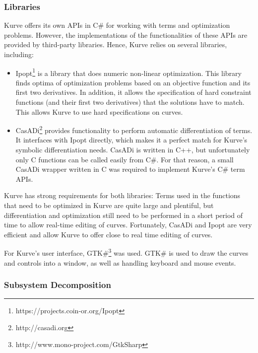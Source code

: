 \documentclass[a4paper]{article}
\begin{document}
			\subsubsection{Libraries}
				
				Kurve offers its own APIs in C\# for working with terms and optimization problems. However, the implementations of the functionalities of these APIs are provided by third-party libraries. Hence, Kurve relies on several libraries, including:
				
				\begin{itemize}
				  	\item Ipopt\footnote{https://projects.coin-or.org/Ipopt} is a library that does numeric non-linear optimization. This library finds optima of optimization problems based on an objective function and its first two derivatives. In addition, it allows the specification of hard constraint functions (and their first two derivatives) that the solutions have to match. This allows Kurve to use hard specifications on curves.
					\item CasADi\footnote{http://casadi.org} provides functionality to perform automatic differentiation of terms. It interfaces with Ipopt directly, which makes it a perfect match for Kurve's symbolic differentiation needs. CasADi is written in C++, but unfortunately only C functions can be called easily from C\#. For that reason, a small CasADi wrapper written in C was required to implement Kurve's C\# term APIs. 
				\end{itemize}
			
				 Kurve has strong requirements for both libraries: Terms used in the functions that need to be optimized in Kurve are quite large and plentiful, but differentiation and optimization still need to be performed in a short period of time to allow real-time editing of curves. Fortunately, CasADi and Ipopt are very efficient and allow Kurve to offer close to real time editing of curves.

				For Kurve's user interface, GTK\#\footnote{http://www.mono-project.com/GtkSharp} was used. GTK\# is used to draw the curves and controls into a window, as well as handling keyboard and mouse events.
				
			\subsubsection{Subsystem Decomposition}	
			
\end{document}
